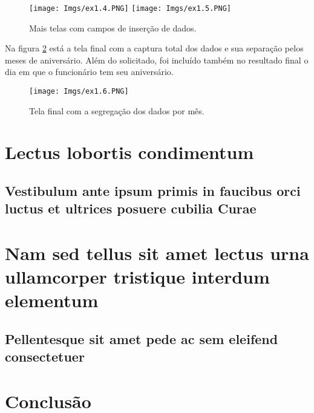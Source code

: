 \documentclass[
	12pt,				%
	openright,			%
	oneside,			%
	a4paper,			%
	chapter=TITLE,		%
	section=TITLE,		%
	english,			%
	french,				%
	spanish,			%
	brazil				%
	]{abntex2}
\begin{document}
	\vspace*{-8mm}

	\begin{figure}[htb]
		\begin{center}
			\caption{Mais telas com campos de inserção de dados.}
			\label{fig:ex1.45}
			\texttt{[image: Imgs/ex1.4.PNG]} \quad
			\texttt{[image: Imgs/ex1.5.PNG]} \quad
		\end{center}
	\end{figure}

	\vspace*{-4mm}

	Na figura \ref{fig:ex1.6} está a tela final com a captura total dos dados e sua separação pelos meses de aniversário. Além do solicitado, foi incluído também no resultado final o dia em que o funcionário tem seu aniversário.

	\begin{figure}[ht]
		\begin{center}
			\caption{Tela final com a segregação dos dados por mês.} 
			\texttt{[image: Imgs/ex1.6.PNG]}
			\label{fig:ex1.6}
		\end{center}
	\end{figure}


\chapter{Lectus lobortis condimentum}

\section{Vestibulum ante ipsum primis in faucibus orci luctus et ultrices
posuere cubilia Curae}

\lipsum[21-22]

\chapter{Nam sed tellus sit amet lectus urna ullamcorper tristique interdum
elementum}

\section{Pellentesque sit amet pede ac sem eleifend consectetuer}

\lipsum[24]


\chapter*[Conclusão]{Conclusão}

\lipsum[31-33]

% 
\end{document}

